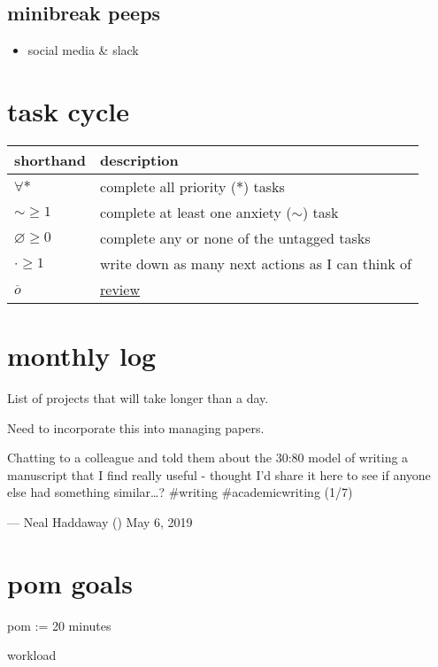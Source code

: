 \documentclass[]{book}
\providecommand{\tightlist}{%
  \setlength{\itemsep}{0pt}\setlength{\parskip}{0pt}}
\begin{document}
\hypertarget{minibreak-peeps}{%
\subsection{minibreak peeps}\label{minibreak-peeps}}

\begin{itemize}
\tightlist
\item
  social media \& slack
\end{itemize}

\hypertarget{task-cycle}{%
\section{task cycle}\label{task-cycle}}

\begin{longtable}[]{@{}ll@{}}
\toprule
shorthand & description\tabularnewline
\midrule
\endhead
\(\forall *\) & complete all priority (\(*\)) tasks\tabularnewline
\(\sim \geqslant 1\) & complete at least one anxiety (\(\sim\)) task\tabularnewline
\(\varnothing \geqslant 0\) & complete any or none of the untagged tasks\tabularnewline
\(\cdot \geqslant 1\) & write down as many next actions as I can think of\tabularnewline
\(\overline o\) & \protect\hyperlink{review}{review}\tabularnewline
\bottomrule
\end{longtable}

\hypertarget{monthly-log}{%
\section{monthly log}\label{monthly-log}}

List of projects that will take longer than a day.

Need to incorporate this into managing papers.

Chatting to a colleague and told them about the 30:80 model of writing a manuscript that I find really useful - thought I'd share it here to see if anyone else had something similar\ldots{}? \#writing \#academicwriting (1/7)

--- Neal Haddaway (\citet{nealhaddaway}) May 6, 2019

\hypertarget{pom-goals}{%
\section{pom goals}\label{pom-goals}}

pom := 20 minutes

workload
\end{document}

